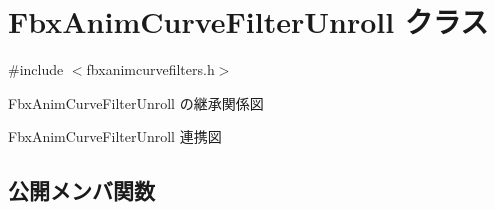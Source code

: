 \hypertarget{class_fbx_anim_curve_filter_unroll}{}\section{Fbx\+Anim\+Curve\+Filter\+Unroll クラス}
\label{class_fbx_anim_curve_filter_unroll}


{\ttfamily \#include $<$fbxanimcurvefilters.\+h$>$}



Fbx\+Anim\+Curve\+Filter\+Unroll の継承関係図


Fbx\+Anim\+Curve\+Filter\+Unroll 連携図
\subsection*{公開メンバ関数}
